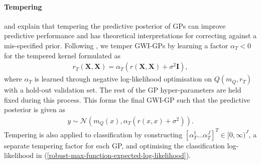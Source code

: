 \documentclass{article}
\numberwithin{equation}{section}
\begin{document}
\paragraph{Tempering}\cite{wild2022generalized} and \cite{adlam2020cold} explain that tempering the predictive posterior of GPs can improve predictive performance and has theoretical interpretations for correcting against a mis-specified prior. Following \cite{wild2022generalized}, we temper GWI-GPs by learning a factor $\alpha_T < 0$ for the tempered kernel formulated as
\begin{align}
    r_T(\mathbf{X}, \mathbf{X}) = \alpha_T \left(r(\mathbf{X}, \mathbf{X})+\sigma^2 \mathbf{I}\right),
\end{align}
where $\alpha_T$ is learned through negative log-likelihood optimisation on $Q\left(m_Q, r_T\right)$ with a hold-out validation set. 
The rest of the GP hyper-parameters are held fixed during this process. 
This forms the final GWI-GP such that the predictive posterior is given as
\begin{align}
    y \sim \mathcal{N}\left(m_Q(x), \alpha_T \left( r(x, x) + \sigma^2\right) \right).
\end{align}
Tempering is also applied to classification by constructing $\left[\alpha_T^1 \dots \alpha_T^J\right]^T \in [0, \infty)^J$, a separate tempering factor for each GP, and optimising the classification log-likelihood in (\ref{robust-max-function-expected-log-likelihood}).
\end{document}

